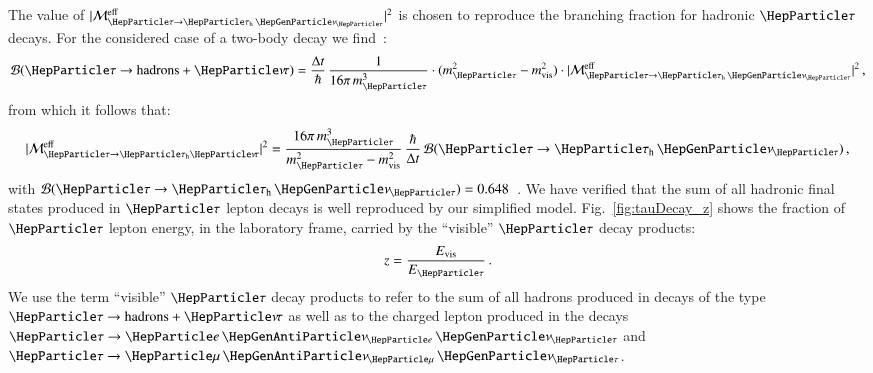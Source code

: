 The value of $\vert\mathcal{M}^{\eff}_{\Pgt \to \tauhnu}\vert^{2}$ is
chosen to reproduce the branching fraction for hadronic $\Pgt$ decays.
For the considered case of a two-body decay we find~\cite{Barger:1987nn}:
\begin{equation}
\mathcal{B}(\Pgt \to \textrm{hadrons} + \Pnut) = \frac{\Delta
  t}{\hbar} \, \frac{1}{16 \pi \, m_{\Pgt}^{3}} \cdot (m_{\Pgt}^{2} - m_{\vis}^{2}) \cdot \vert \mathcal{M}^{\textrm{eff}}_{\Pgt \to
  \tauhnu} \vert^{2} \, ,
\end{equation}
from which it follows that:
\begin{equation}
\vert \mathcal{M}^{\textrm{eff}}_{\Pgt \to \tauh\Pnut} \vert^{2} = \frac{16 \pi \, m_{\Pgt}^{3}}{m_{\Pgt}^{2} - m_{\vis}^{2}} \, \frac{\hbar}{\Delta t} \, \mathcal{B}(\Pgt \to \tauhnu) \, , 
\end{equation}
with $\mathcal{B}(\Pgt \to \tauhnu) = 0.648$~\cite{PDG}.
We have verified that the sum of all hadronic final states produced in $\Pgt$ lepton decays
is well reproduced by our simplified model.
Fig.~\ref{fig:tauDecay_z} shows the fraction of $\Pgt$ lepton energy,
in the laboratory frame, carried by the ``visible'' $\Pgt$ decay
products:
\begin{equation}
z = \frac{E_{\vis}}{E_{\Pgt}} \, .
\label{eq:def_z}
\end{equation}
We use the term ``visible'' $\Pgt$ decay products to refer to the sum
of all hadrons produced in decays of the type $\Pgt \to \textrm{hadrons} + \Pnut$ 
as well as to the charged lepton produced in the decays $\Pgt \to \enunu$ and $\Pgt \to \mununu$.

